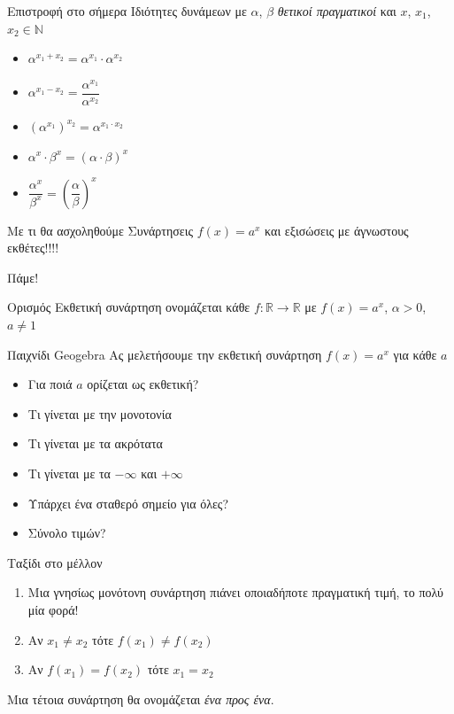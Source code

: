 \documentclass{presentation}
\begin{document}
\begin{frame}{Επιστροφή στο σήμερα}
  Ιδιότητες δυνάμεων με $α$, $β$ \emph{θετικοί πραγματικοί} και $x$, $x_1$, $x_2\in\mathbb{N}$
  \begin{itemize}
    \item $α^{x_1+x_2}=α^{x_1}\cdot α^{x_2}$
    \item $α^{x_1-x_2}=\dfrac{α^{x_1}}{α^{x_2}}$
    \item $\left( α^{x_1} \right)^{x_2}=α^{x_1\cdot x_2}$
    \item $α^x\cdot β^x=(α\cdot β)^x$
    \item $\dfrac{α^x}{β^x}=\left(   \dfrac{α}{β}\right)^x$
  \end{itemize}
\end{frame}

\begin{frame}{Με τι θα ασχοληθούμε}
  Συνάρτησεις $f(x)=a^x$ και εξισώσεις με άγνωστους εκθέτες!!!!
\end{frame}

\begin{frame}{Πάμε!}
  \begin{block}{Ορισμός}
    Εκθετική συνάρτηση ονομάζεται κάθε $f:\mathbb{R}\to\mathbb{R}$ με $f(x)=a^x$, $α>0$, $a\ne 1$
  \end{block}
\end{frame}

\begin{frame}{Παιχνίδι Geogebra}
  Ας μελετήσουμε την εκθετική συνάρτηση $f(x)=a^x$ για κάθε $a$ \href{https://www.geogebra.org/m/tuzgusfm}{}
  \begin{itemize}
    \item<1-> Για ποιά $a$ ορίζεται ως εκθετική?
    \item<2-> Τι γίνεται με την μονοτονία
    \item<3-> Τι γίνεται με τα ακρότατα
    \item<4-> Τι γίνεται με τα $-\infty$ και $+\infty$
    \item<5-> Υπάρχει ένα σταθερό σημείο για όλες?
    \item<6-> Σύνολο τιμών?
  \end{itemize}
\end{frame}

\begin{frame}{Ταξίδι στο μέλλον}
  \begin{enumerate}
    \item<1-> Μια γνησίως μονότονη συνάρτηση πιάνει οποιαδήποτε πραγματική τιμή, το πολύ μία φορά!
    \item<2-> Αν $x_1\ne x_2$ τότε $f(x_1)\ne f(x_2)$
    \item<3-> Αν $f(x_1)=f(x_2)$ τότε $x_1=x_2$
  \end{enumerate}
   Μια τέτοια συνάρτηση θα ονομάζεται \emph{ένα προς ένα}.
\end{frame}
\end{document}
